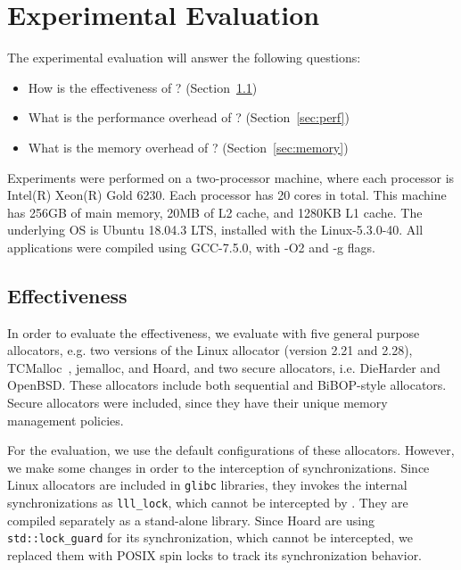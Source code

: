 \section{Experimental Evaluation}
\label{sec:evaluation}

The experimental evaluation will answer the following questions:
\begin{itemize}
\item How is the effectiveness of \MP{}? (Section~\ref{sec:effectiveness}) 	
\item What is the performance overhead of \MP{}? (Section~\ref{sec:perf})
\item What is the memory overhead of \MP{}? (Section~\ref{sec:memory})
\end{itemize}

Experiments were performed on a two-processor machine, where each processor is Intel(R) Xeon(R) Gold 6230. Each processor has 20 cores in total. This machine has 256GB of main memory, 20MB of L2 cache, and 1280KB L1 cache. The underlying OS is Ubuntu 18.04.3 LTS, installed with the Linux-5.3.0-40. All applications were compiled using GCC-7.5.0, with -O2 and -g flags.

\subsection{Effectiveness}
\label{sec:effectiveness}

In order to evaluate the effectiveness, we evaluate \MP{} with five general purpose allocators, e.g. two versions of the Linux allocator (version 2.21 and 2.28), TCMalloc~\citep{tcmalloc}, jemalloc, and Hoard, and two secure allocators, i.e. DieHarder and OpenBSD. These allocators include both sequential and BiBOP-style allocators. Secure allocators were included, since they have their unique memory management policies. 

For the evaluation, we use the default configurations of these allocators. However, we make some changes in order to the interception of synchronizations. Since Linux allocators are included in \texttt{glibc} libraries, they invokes the internal synchronizations as \texttt{lll\_lock}, which cannot be intercepted by \MP{}. They are compiled separately as a stand-alone library. Since Hoard are using \texttt{std::lock\_guard} for its synchronization, which cannot be intercepted, we replaced them with POSIX spin locks to track its synchronization behavior.


